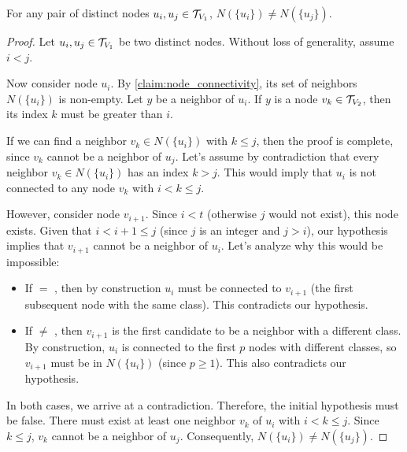 \begin{lemma} \label{lemma:distinct_neighborhoods}
    For any pair of distinct nodes $u_i, u_j \in \mathcal{T}_{V_1}$, $N(\{u_i\}) \neq N(\{u_j\})$.
\end{lemma}
\begin{proof}
    Let $u_i, u_j \in \mathcal{T}_{V_1}$ be two distinct nodes. Without loss of generality, assume $i < j$. 

     

    Now consider node $u_i$. By \cref{claim:node_connectivity}, its set of neighbors $N(\{u_i\})$ is non-empty. Let $y$ be a neighbor of $u_i$. If $y$ is a node $v_k \in \mathcal{T}_{V_2}$, then its index $k$ must be greater than $i$.

    If we can find a neighbor $v_k \in N(\{u_i\})$ with $k \leq j$, then the proof is complete, since $v_k$ cannot be a neighbor of $u_j$. Let's assume by contradiction that every neighbor $v_k \in N(\{u_i\})$ has an index $k > j$. This would imply that $u_i$ is not connected to any node $v_k$ with $i < k \leq j$.

    However, consider node $v_{i+1}$. Since $i < t$ (otherwise $j$ would not exist), this node exists. Given that $i < i+1 \leq j$ (since $j$ is an integer and $j>i$), our hypothesis implies that $v_{i+1}$ cannot be a neighbor of $u_i$. Let's analyze why this would be impossible:
    \begin{itemize}
        \item If  $=$ , then by construction $u_i$ must be connected to $v_{i+1}$ (the first subsequent node with the same class). This contradicts our hypothesis.
        \item If  $\neq$ , then $v_{i+1}$ is the first candidate to be a neighbor with a different class. By construction, $u_i$ is connected to the first $p$ nodes with different classes, so $v_{i+1}$ must be in $N(\{u_i\})$ (since $p \geq 1$). This also contradicts our hypothesis.
    \end{itemize}
    In both cases, we arrive at a contradiction. Therefore, the initial hypothesis must be false. There must exist at least one neighbor $v_k$ of $u_i$ with $i < k \leq j$. Since $k \leq j$, $v_k$ cannot be a neighbor of $u_j$. Consequently, $N(\{u_i\}) \neq N(\{u_j\})$.
\end{proof}


